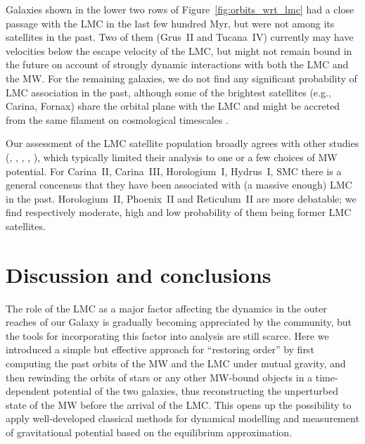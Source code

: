 \documentclass[usenatbib,fleqn]{mnras}
\begin{document}
Galaxies shown in the lower two rows of Figure~\ref{fig:orbits_wrt_lmc} had a close passage with the LMC in the last few hundred Myr, but were not among its satellites in the past. Two of them (Grus~II and Tucana~IV) currently may have velocities below the escape velocity of the LMC, but might not remain bound in the future on account of strongly dynamic interactions with both the LMC and the MW. 
For the remaining galaxies, we do not find any significant probability of LMC association in the past, although some of the brightest satellites (e.g., Carina, Fornax) share the orbital plane with the LMC and might be accreted from the same filament on cosmological timescales \citep[e.g.,][]{Pardy2020}.

Our assessment of the LMC satellite population broadly agrees with other studies (\citealt{Jethwa2016}, \citealt{Kallivayalil2018}, \citealt{Erkal2020a}, \citealt{Patel2020}, \citealt{Battaglia2021}), which typically limited their analysis to one or a few choices of MW potential. For Carina~II, Carina~III, Horologium~I, Hydrus~I, SMC there is a general concensus that they have been associated with (a massive enough) LMC in the past. Horologium~II, Phoenix~II and Reticulum~II are more debatable; we find respectively moderate, high and low probability of them being former LMC satellites.


\section{Discussion and conclusions}  \label{sec:summary}

The role of the LMC as a major factor affecting the dynamics in the outer reaches of our Galaxy is gradually becoming appreciated by the community, but the tools for incorporating this factor into analysis are still scarce. Here we introduced a simple but effective approach for ``restoring order'' by first computing the past orbits of the MW and the LMC under mutual gravity, and then rewinding the orbits of stars or any other MW-bound objects in a time-dependent potential of the two galaxies, thus reconstructing the unperturbed state of the MW before the arrival of the LMC.
This opens up the possibility to apply well-developed classical methods for dynamical modelling and measurement of gravitational potential based on the equilibrium approximation. 
\end{document}
